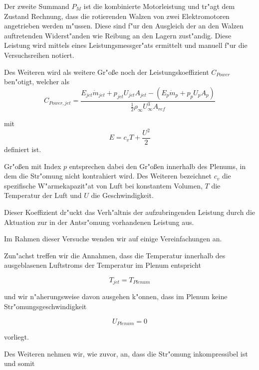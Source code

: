 Der zweite Summand $ P_M$ ist die kombinierte Motorleistung und tr"agt dem Zustand Rechnung, dass die rotierenden Walzen von zwei Elektromotoren angetrieben werden m"ussen. Diese sind f"ur den Ausgleich der an den Walzen auftretenden Widerst"anden wie Reibung an den Lagern zust"andig.
Diese Leistung wird mittels eines Leistungsmessger"ats ermittelt und manuell f"ur die Versuchsreihen notiert.


Des Weiteren wird als weitere Gr"o\ss{}e noch der Leistungskoeffizient $C_{Power}$ ben"otigt, welcher als
\begin{equation}
	\label{eq:def-powercoefficient}
	C_{Power,jet} = \frac{E_{jet}\dot{m}_{jet} + p_{jet}U_{jet}A_{jet} - (E_p\dot{m}_p + p_p U_p A_p)}{\frac{1}{2}\rho_{\infty}U^3_{\infty} A_{ref}}
\end{equation}

mit
\begin{equation}
	\label{eq:def-energieterm}
	E = c_vT + \frac{U^2}{2}
\end{equation}		
definiert ist.\cite{Hucho.2011}

Gr"o\ss{}en mit Index $p$ entsprechen dabei den Gr"o\ss{}en innerhalb des Plenums, in dem die Str"omung nicht kontrahiert wird.
Des Weiteren bezeichnet $c_v$ die spezifische W"armekapazit"at von Luft bei konstantem Volumen, $T$ die Temperatur der Luft und $U$ die Geschwindigkeit.

Dieser Koeffizient dr"uckt das Verh"altnis der aufzubringenden Leistung durch die Aktuation zur in der Antsr"omung vorhandenen Leistung aus.

Im Rahmen dieser Versuche wenden wir auf  einige Vereinfachungen an. 

Zun"achst treffen wir die Annahmen, dass die Temperatur innerhalb des ausgeblasenen Luftstroms der Temperatur im Plenum entspricht

	\begin{equation}
	\label{eq:T-Vereinfachung}
		T_{jet} = T_{Plenum}
	\end{equation}

und wir n"aherungsweise davon ausgehen k"onnen, dass im Plenum keine Str"omungsgeschwindigkeit 

	\begin{equation}
	\label{eq:Up}
		U_{Plenum} = 0
	\end{equation}

vorliegt.

Des Weiteren nehmen wir, wie zuvor, an, dass die Str"omung inkompressibel ist und somit

